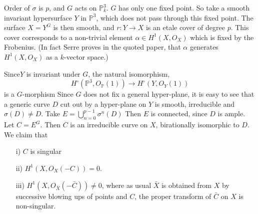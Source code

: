 Order of $\sigma$ is $p$, and $G$ acts on $\mathbb{P}_k^3$. $G$ has only
one fixed point. So take a smooth invariant hypersurface $Y$ in
$\mathbb{P}^3$, which does not pass through this fixed point. The
surface $X=Y^G$ is then smooth, and $r:Y\longrightarrow X$ is an etale
cover of degree $p$. This cover corresponds to a non-trivial element
$\alpha\in H^1(X,O_X)$ which is fixed by the Frobenius. (In fact Serre
proves in the quoted paper, that $\alpha$ generates $H^1(X,O_X)$ as a
$k$-vector space.)

Since\pageoriginale $Y$ is invariant under $G$, the natural
isomorphism,
$$
H^\circ(\mathbb{P}^3,O_{\mathbb{P}}(1))\longrightarrow
H^\circ(Y,O_Y(1))
$$
is a $G$-morphism Since $G$ does not fix a general hyper-plane, it is
easy to see that a generic curve $D$ cut out by a hyper-plane on $Y$
is smooth, irreducible and $\sigma(D)\neq D$. Take
$E=\bigcup\limits_{n=0}^{p-1}\sigma^n(D)$ Then $E$ is connected, since
$D$ is ample. Let $C=E^G$. Then $C$ is an irreducible curve on $X$,
birationally isomorphic to $D$. We claim that
\begin{itemize}
\item [i)] $C$ is singular\quad

\item [ii)] $H^1(X,O_X(-C))=0$.

\item [iii)] $H^1(X,O_{\bar{X}}(-\bar{C}))\neq 0$, where as usual
  $\bar{X}$ is obtained from $X$ by successive blowing ups of points
  and $C$, the proper transform of $\bar{C}$ on $X$ is non-singular.
\end{itemize}

